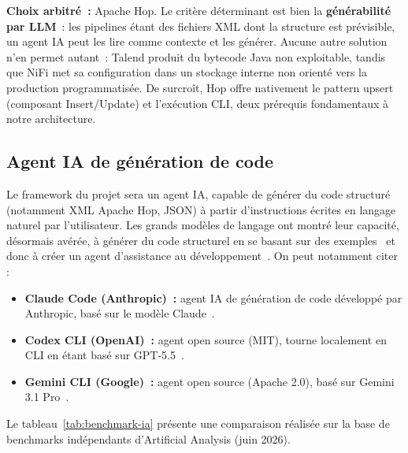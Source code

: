 \textbf{Choix arbitré~:} Apache Hop. Le critère déterminant est bien la \textbf{générabilité par LLM}~: les pipelines étant des fichiers XML dont la structure est prévisible, un agent IA peut les lire comme contexte et les générer. Aucune autre solution n'en permet autant~: Talend produit du bytecode Java non exploitable, tandis que NiFi met sa configuration dans un stockage interne non orienté vers la production programmatisée. De surcroît, Hop offre nativement le pattern upsert (composant Insert/Update) et l'exécution CLI, deux prérequis fondamentaux à notre architecture.

\subsection{Agent IA de génération de code}

Le framework du projet sera un agent IA, capable de générer du code structuré (notamment XML Apache Hop, JSON) à partir d'instructions écrites en langage naturel par l'utilisateur. Les grands modèles de langage ont montré leur capacité, désormais avérée, à générer du code structurel en se basant sur des exemples~\cite{brown2020} et donc à créer un agent d'assistance au développement~\cite{chen2023}. On peut notamment citer :

\begin{itemize}
    \item \textbf{Claude Code (Anthropic)~:} agent IA de génération de code développé par Anthropic, basé sur le modèle Claude~\cite{anthropic_claude}.
    \item \textbf{Codex CLI (OpenAI)~:} agent open source (MIT), tourne localement en CLI en étant basé sur GPT-5.5~\cite{openai_codex}.
    \item \textbf{Gemini CLI (Google)~:} agent open source (Apache 2.0), basé sur Gemini 3.1 Pro~\cite{google_gemini_cli}.
\end{itemize}

Le tableau~\ref{tab:benchmark-ia} présente une comparaison réalisée sur la base de benchmarks indépendants d'Artificial Analysis (juin 2026).

